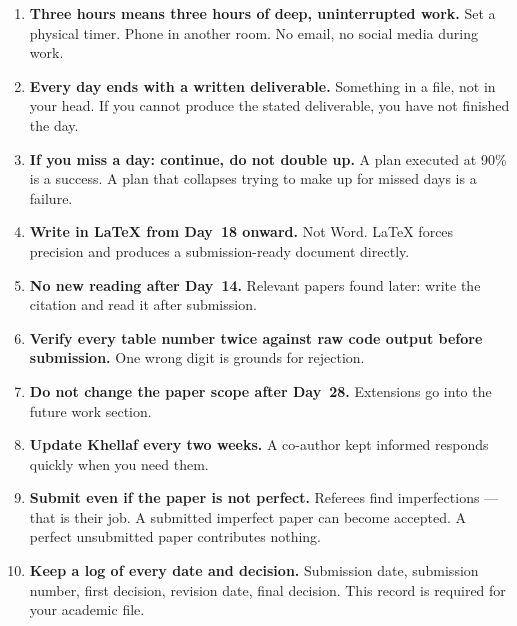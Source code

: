 \documentclass[12pt,a4paper]{article}
\begin{document}
\begin{enumerate}[leftmargin=2em,itemsep=8pt,
                  label=\textbf{R\arabic*.}]

  \item \textbf{Three hours means three hours of deep,
    uninterrupted work.} Set a physical timer. Phone in
    another room. No email, no social media during work.

  \item \textbf{Every day ends with a written deliverable.}
    Something in a file, not in your head. If you cannot
    produce the stated deliverable, you have not finished
    the day.

  \item \textbf{If you miss a day: continue, do not
    double up.} A plan executed at 90\% is a success.
    A plan that collapses trying to make up for missed
    days is a failure.

  \item \textbf{Write in \LaTeX{} from Day~18 onward.}
    Not Word. \LaTeX{} forces precision and produces a
    submission-ready document directly.

  \item \textbf{No new reading after Day~14.} Relevant
    papers found later: write the citation and read it
    after submission.

  \item \textbf{Verify every table number twice against
    raw code output before submission.} One wrong digit
    is grounds for rejection.

  \item \textbf{Do not change the paper scope after
    Day~28.} Extensions go into the future work section.

  \item \textbf{Update Khellaf every two weeks.}
    A co-author kept informed responds quickly when you
    need them.

  \item \textbf{Submit even if the paper is not perfect.}
    Referees find imperfections --- that is their job.
    A submitted imperfect paper can become accepted.
    A perfect unsubmitted paper contributes nothing.

  \item \textbf{Keep a log of every date and decision.}
    Submission date, submission number, first decision,
    revision date, final decision.
    This record is required for your academic file.

\end{enumerate}
\end{document}
